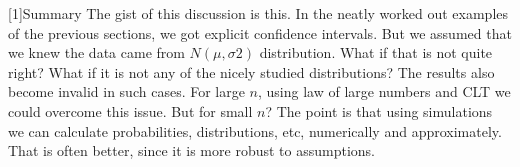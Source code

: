 \documentclass[preprint,  11pt]{amsart}
\theoremstyle{plain} %
\theoremstyle{definition} %
\newtheorem{question}[theorem]{Question}
\begin{document}
[1]{\vspace{4mm}Summary} The gist of this discussion is this. In the neatly worked out examples of the previous sections, we got explicit confidence intervals. But we assumed that we knew the data came from $N(\mu,{\sigma}{2})$ distribution. What if that is not quite right? What if it is not any of the nicely studied distributions? The results also become invalid in such cases. For large $n$, using law of large numbers and CLT we could overcome this issue. But for small $n$? The point is that using simulations we can calculate probabilities, distributions, etc, numerically and approximately. That is often better, since it is more robust to assumptions.



\end{document}
